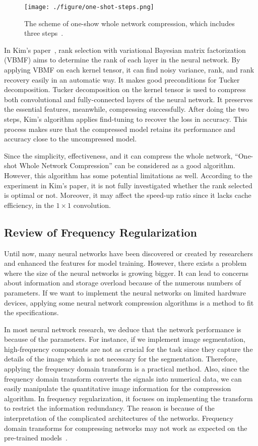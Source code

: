 \documentclass{article}
\begin{document}
\begin{figure}[!h]
	\centering
	\texttt{[image: ./figure/one-shot-steps.png]}
	\caption{The scheme of one-show whole network compression, which includes three steps~\cite{kim2016compression}.}
	\label{one-shot-steps}
\end{figure}

In Kim’s paper~\cite{kim2016compression}, rank selection with variational Bayesian matrix factorization (VBMF) aims to determine the rank of each layer in the neural network. By applying VBMF on each kernel tensor, it can find noisy variance, rank, and rank recovery easily in an automatic way. It makes good preconditions for Tucker decomposition. Tucker decomposition on the kernel tensor is used to compress both convolutional and fully-connected layers of the neural network. It preserves the essential features, meanwhile, compressing successfully. After doing the two steps, Kim’s algorithm applies find-tuning to recover the loss in accuracy. This process makes sure that the compressed model retains its performance and accuracy close to the uncompressed model.

Since the simplicity, effectiveness, and it can compress the whole network, “One-shot Whole Network Compression” can be considered as a good algorithm. However, this algorithm has some potential limitations as well. According to the experiment in Kim’s paper, it is not fully investigated whether the rank selected is optimal or not. Moreover, it may affect the speed-up ratio since it lacks cache efficiency, in the $1 \times 1$ convolution.


\subsection{Review of Frequency Regularization}

Until now, many neural networks have been discovered or created by researchers and enhanced the features for model training. However, there exists a problem where the size of the neural networks is growing bigger. It can lead to concerns about information and storage overload because of the numerous numbers of parameters. If we want to implement the neural networks on limited hardware devices, applying some neural network compression algorithms is a method to fit the specifications. 

In most neural network research, we deduce that the network performance is because of the parameters. For instance, if we implement image segmentation, high-frequency components are not as crucial for the task since they capture the details of the image which is not necessary for the segmentation. Therefore, applying the frequency domain transform is a practical method. Also, since the frequency domain transform converts the signals into numerical data, we can easily manipulate the quantitative image information for the compression algorithm. In frequency regularization, it focuses on implementing the transform to restrict the information redundancy. The reason is because of the interpretation of the complicated architectures of the networks. Frequency domain transforms for compressing networks may not work as expected on the pre-trained models~\cite{zhao2023frequency}. 
\end{document}
